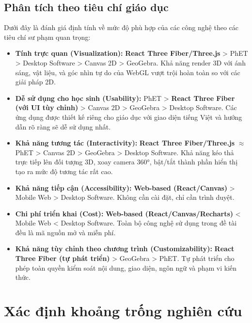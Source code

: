 \subsection{Phân tích theo tiêu chí giáo dục}

Dưới đây là đánh giá định tính về mức độ phù hợp của các công nghệ theo các tiêu chí sư phạm quan trọng:

\begin{itemize}
    \item \textbf{Tính trực quan (Visualization):} \textbf{React Three Fiber/Three.js} > PhET > Desktop Software > Canvas 2D > GeoGebra. Khả năng render 3D với ánh sáng, vật liệu, và góc nhìn tự do của WebGL vượt trội hoàn toàn so với các giải pháp 2D.
    
    \item \textbf{Dễ sử dụng cho học sinh (Usability):} PhET > \textbf{React Three Fiber (với UI tùy chỉnh)} > Canvas 2D > GeoGebra > Desktop Software. Các ứng dụng được thiết kế riêng cho giáo dục với giao diện tiếng Việt và hướng dẫn rõ ràng sẽ dễ sử dụng nhất.
    
    \item \textbf{Khả năng tương tác (Interactivity):} \textbf{React Three Fiber/Three.js} $\approx$ PhET > Canvas 2D > GeoGebra > Desktop Software. Khả năng kéo thả trực tiếp lên đối tượng 3D, xoay camera 360°, bật/tắt thành phần hiển thị tạo ra mức độ tương tác rất cao.
    
    \item \textbf{Khả năng tiếp cận (Accessibility):} \textbf{Web-based (React/Canvas)} > Mobile Web > Desktop Software. Không cần cài đặt, chỉ cần trình duyệt.
    
    \item \textbf{Chi phí triển khai (Cost):} \textbf{Web-based (React/Canvas/Recharts)} < Mobile Web < Desktop Software. Toàn bộ công nghệ sử dụng trong đề tài đều là mã nguồn mở và miễn phí.
    
    \item \textbf{Khả năng tùy chỉnh theo chương trình (Customizability):} \textbf{React Three Fiber (tự phát triển)} > GeoGebra > PhET. Tự phát triển cho phép toàn quyền kiểm soát nội dung, giao diện, ngôn ngữ và phạm vi kiến thức.
\end{itemize}

\section{Xác định khoảng trống nghiên cứu}

